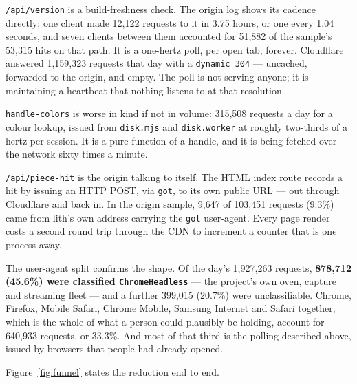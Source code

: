 \documentclass[10pt,letterpaper,twocolumn]{article}
\begin{document}
\texttt{/api/version} is a build-freshness check. The origin log shows
its cadence directly: one client made 12,122 requests to it in 3.75
hours, or one every 1.04 seconds, and seven clients between them
accounted for 51,882 of the sample's 53,315 hits on that path. It is a
one-hertz poll, per open tab, forever. Cloudflare answered 1,159,323
requests that day with a \texttt{dynamic 304} --- uncached, forwarded to
the origin, and empty. The poll is not serving anyone; it is
maintaining a heartbeat that nothing listens to at that resolution.

\texttt{handle-colors} is worse in kind if not in volume: 315,508
requests a day for a colour lookup, issued from \texttt{disk.mjs} and
\texttt{disk.worker} at roughly two-thirds of a hertz per session. It
is a pure function of a handle, and it is being fetched over the
network sixty times a minute.

\texttt{/api/piece-hit} is the origin talking to itself. The HTML index
route records a hit by issuing an HTTP POST, via \texttt{got}, to its
own public URL --- out through Cloudflare and back in. In the origin
sample, 9,647 of 103,451 requests (9.3\%) came from lith's own address
carrying the \texttt{got} user-agent. Every page render costs a second
round trip through the CDN to increment a counter that is one process
away.

The user-agent split confirms the shape. Of the day's 1,927,263
requests, \textbf{878,712 (45.6\%) were classified \texttt{ChromeHeadless}} ---
the project's own oven, capture and streaming fleet --- and a further
399,015 (20.7\%) were unclassifiable. Chrome, Firefox, Mobile Safari,
Chrome Mobile, Samsung Internet and Safari together, which is the whole
of what a person could plausibly be holding, account for 640,933
requests, or 33.3\%. And most of that third is the polling described
above, issued by browsers that people had already opened.

Figure~\ref{fig:funnel} states the reduction end to end.
\end{document}
